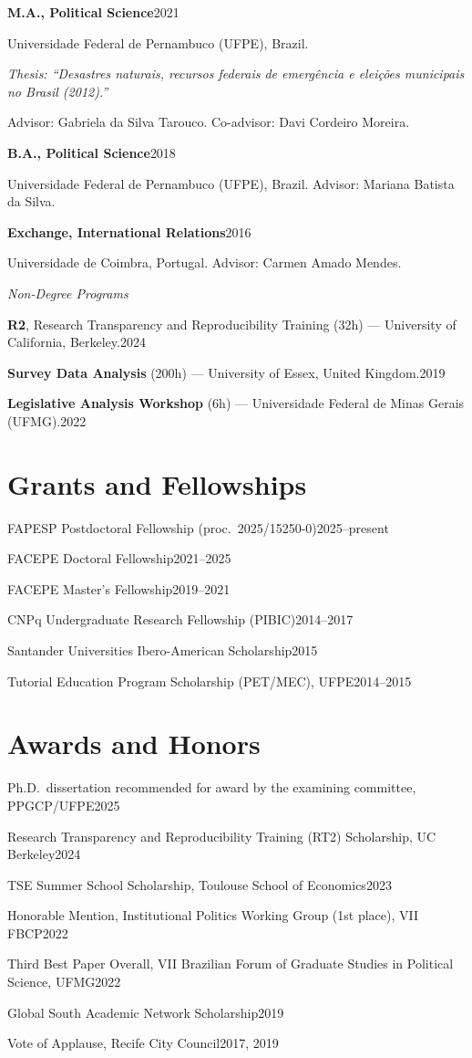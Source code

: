 \documentclass[11pt]{article}
\newcommand{\cvsubsection}[1]{\vspace{0.9em}\textit{#1}\par\vspace{0.35em}}
\newcommand{\entry}[2]{\noindent\textbf{#1}\hfill #2\par\vspace{0.15em}}
\newcommand{\entryplain}[2]{\noindent#1\hfill #2\par\vspace{0.15em}}
\newcommand{\detail}[1]{\noindent\hspace*{1.5em}#1\par\vspace{0.15em}}
\newcommand{\detailem}[1]{\noindent\hspace*{1.5em}\textit{#1}\par\vspace{0.15em}}
\begin{document}
\entry{M.A., Political Science}{2021}
\detail{Universidade Federal de Pernambuco (UFPE), Brazil.}
\detailem{Thesis: ``Desastres naturais, recursos federais de emergência e eleições municipais no Brasil (2012).''}
\detail{Advisor: Gabriela da Silva Tarouco. Co-advisor: Davi Cordeiro Moreira.}

\entry{B.A., Political Science}{2018}
\detail{Universidade Federal de Pernambuco (UFPE), Brazil. Advisor: Mariana Batista da Silva.}

\entry{Exchange, International Relations}{2016}
\detail{Universidade de Coimbra, Portugal. Advisor: Carmen Amado Mendes.}

\cvsubsection{Non-Degree Programs}

\entryplain{\textbf{R2}, Research Transparency and Reproducibility Training (32h) --- University of California, Berkeley.}{2024}

\entryplain{\textbf{Survey Data Analysis} (200h) --- University of Essex, United Kingdom.}{2019}

\entryplain{\textbf{Legislative Analysis Workshop} (6h) --- Universidade Federal de Minas Gerais (UFMG).}{2022}

\section{Grants and Fellowships}

\entryplain{FAPESP Postdoctoral Fellowship (proc.\ 2025/15250-0)}{2025--present}
\entryplain{FACEPE Doctoral Fellowship}{2021--2025}
\entryplain{FACEPE Master's Fellowship}{2019--2021}
\entryplain{CNPq Undergraduate Research Fellowship (PIBIC)}{2014--2017}
\entryplain{Santander Universities Ibero-American Scholarship}{2015}
\entryplain{Tutorial Education Program Scholarship (PET/MEC), UFPE}{2014--2015}

\section{Awards and Honors}

\entryplain{Ph.D.\ dissertation recommended for award by the examining committee, PPGCP/UFPE}{2025}
\entryplain{Research Transparency and Reproducibility Training (RT2) Scholarship, UC Berkeley}{2024}
\entryplain{TSE Summer School Scholarship, Toulouse School of Economics}{2023}
\entryplain{Honorable Mention, Institutional Politics Working Group (1st place), VII FBCP}{2022}
\entryplain{Third Best Paper Overall, VII Brazilian Forum of Graduate Studies in Political Science, UFMG}{2022}
\entryplain{Global South Academic Network Scholarship}{2019}
\entryplain{Vote of Applause, Recife City Council}{2017, 2019}
\end{document}
